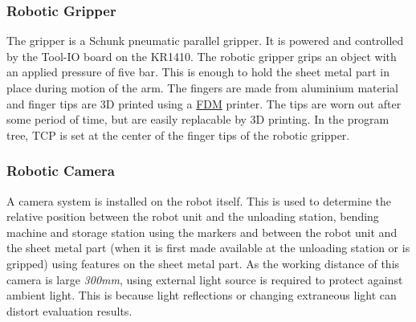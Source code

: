 \subsubsection{Robotic Gripper}
The gripper is a Schunk pneumatic parallel gripper. It is powered and controlled by the Tool-IO board on the KR1410.
The robotic gripper grips an object with an applied pressure of five bar. This is enough to hold the sheet metal part
in place during motion of the arm. 
The fingers are made from aluminium material and finger tips are 3D printed using a \hyperref[acro:FDM]{FDM} printer. The tips are worn out
after some period of time, but are easily replacable by 3D printing.
In the program tree, TCP is set at the center of the finger tips of the robotic gripper.


\subsubsection{Robotic Camera}
A camera system is installed on the robot itself. This is used to determine the relative
position between the robot unit and the unloading station, bending machine and storage station using the markers
and between the robot unit and the sheet metal part (when it is first made available at the
unloading station or is gripped) using features on the sheet metal part.
As the working distance of this camera is large \textit{300mm}, using external light source is required to protect against ambient light. 
This is because light reflections or changing extraneous light can distort evaluation results.
